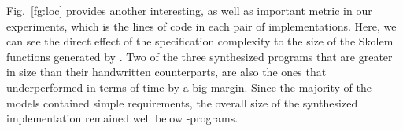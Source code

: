 Fig.~\ref{fg:loc} provides another interesting, as well as important metric in
our experiments, which is the lines of code in each pair of implementations.
Here, we can see the direct effect of the specification complexity to the size
of the Skolem functions generated by \aeval. Two of the three synthesized
programs that are greater in size than their handwritten counterparts, are also
the ones that underperformed in terms of time by a big margin. Since the
majority of the models contained simple requirements, the overall size of the synthesized implementation remained well below \lustrev-programs.
%

